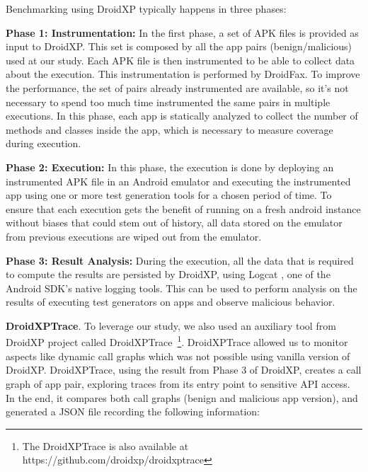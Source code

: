Benchmarking using DroidXP typically happens in three phases:

\textbf{Phase 1: Instrumentation:} In the first phase, a set of APK files is provided as input to DroidXP. This set is composed by all the app pairs (benign/malicious) used at our study. Each APK file is then instrumented to be able to collect data about the execution. This instrumentation is performed by DroidFax. To improve the performance, the set of pairs already instrumented are available, so it's not necessary to spend too much time instrumented the same pairs in multiple executions. In this phase, each app is statically analyzed to collect the number of methods and classes inside the app, which is necessary to measure coverage during execution. %

\textbf{Phase 2: Execution:} In this phase, the execution is done by deploying an instrumented APK file in an Android emulator and executing the instrumented app using one or more test generation tools for a chosen period of time. To ensure that each execution gets the benefit of running on a fresh android instance without biases that could stem out of history, all data stored on the emulator from previous executions are wiped out from the emulator. 

\textbf{Phase 3: Result Analysis:} During the execution, all the data that is required to compute the results are persisted by DroidXP, using Logcat \cite{Logcat}, one of the Android SDK's native logging tools. This can be used to perform analysis on the results of executing test generators on apps and observe malicious behavior. 

\textbf{DroidXPTrace}. To leverage our study, we also used an auxiliary tool from DroidXP project called DroidXPTrace~\footnote{The DroidXPTrace is also available at https://github.com/droidxp/droidxptrace}. DroidXPTrace allowed us to monitor aspects like dynamic call graphs which was not possible using vanilla version of DroidXP. DroidXPTrace, using the result from Phase 3 of DroidXP, creates a call graph of app pair, exploring traces from its entry point to sensitive API access. In the end, it compares both call graphs (benign and malicious app version), and generated a JSON file recording the following information:

